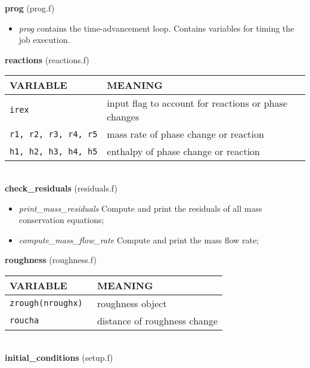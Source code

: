 %
%
{\large{\bf prog}} (prog.f)\\[5mm]
\begin{itemize}
\item {\em prog} contains the time-advancement loop. Contains variables for timing the job execution.
\end{itemize}
%
%
{\large{\bf reactions}} (reactions.f)\\[5mm]
\begin{tabular}{|p{6cm}|p{6cm}|}\hline
VARIABLE & MEANING\\\hline
\tt irex & input flag to account for reactions or phase changes\\\hline 
\tt r1, r2, r3, r4, r5 & mass rate of phase change or reaction\\\hline
\tt h1, h2, h3, h4, h5 & enthalpy of phase change or reaction\\\hline
\end{tabular}\\[5mm]
%
%
{\large{\bf check\_residuals}} (residuals.f)\\
\begin{itemize}
\item {\em print\_mass\_residuals} Compute and print the residuals of all mass conservation equations;
\item {\em compute\_mass\_flow\_rate} Compute and print the mass flow rate;
\end{itemize}
%
%
{\large{\bf roughness}} (roughness.f)\\[5mm]
\begin{tabular}{|p{6cm}|p{6cm}|}\hline
VARIABLE & MEANING\\\hline
\tt zrough(nroughx) & roughness object\\\hline
\tt roucha & distance of roughness change\\\hline
\end{tabular}\\[5mm]
%
%
{\large{\bf initial\_conditions}} (setup.f)\\[5mm]
